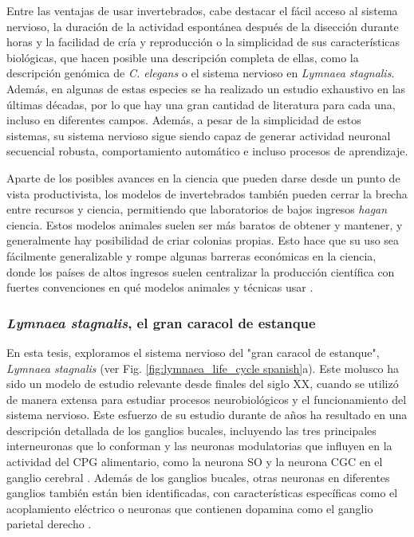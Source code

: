 Entre las ventajas de usar invertebrados, cabe destacar el fácil acceso al sistema nervioso, la duración de la actividad espontánea después de la disección durante horas y la facilidad de cría y reproducción o la simplicidad de sus características biológicas, que hacen posible una descripción completa de ellas, como la descripción genómica de \textit{C. elegans} o el sistema nervioso en \textit{Lymnaea stagnalis}. Además, en algunas de estas especies se ha realizado un estudio exhaustivo en las últimas décadas, por lo que hay una gran cantidad de literatura para cada una, incluso en diferentes campos. Además, a pesar de la simplicidad de estos sistemas, su sistema nervioso sigue siendo capaz de generar actividad neuronal secuencial robusta, comportamiento automático e incluso procesos de aprendizaje.

Aparte de los posibles avances en la ciencia que pueden darse desde un punto de vista productivista, los modelos de invertebrados también pueden cerrar la brecha entre recursos y ciencia, permitiendo que laboratorios de bajos ingresos \textit{hagan} ciencia. Estos modelos animales suelen ser más baratos de obtener y mantener, y generalmente hay posibilidad de criar colonias propias. Esto hace que su uso sea fácilmente generalizable y rompe algunas barreras económicas en la ciencia, donde los países de altos ingresos suelen centralizar la producción científica con fuertes convenciones en qué modelos animales y técnicas usar \parencite{castillo_spineless_2017,stephan_how_2015}.

\subsubsection{\textit{Lymnaea stagnalis}, el gran caracol de estanque}
En esta tesis, exploramos el sistema nervioso del "gran caracol de estanque", \textit{Lymnaea stagnalis} (ver Fig. \ref{fig:lymnaea_life_cycle spanish}a). Este molusco ha sido un modelo de estudio relevante desde finales del siglo XX, cuando se utilizó de manera extensa para estudiar procesos neurobiológicos y el funcionamiento del sistema nervioso. Este esfuerzo de su estudio durante de años ha resultado en una descripción detallada de los ganglios bucales, incluyendo las tres principales interneuronas que lo conforman \parencite{benjamin_snail_1989,benjamin_morphology_1979,rose_relationship_1979,brierley_behavioral_1997} y las neuronas modulatorias que influyen en la actividad del CPG alimentario, como la neurona SO y la neurona CGC en el ganglio cerebral \parencite{rose_interneuronal_1981,mccrohan_patterns_1980,kemenes_multiple_2001}. Además de los ganglios bucales, otras neuronas en diferentes ganglios también están bien identificadas, con características específicas como el acoplamiento eléctrico o neuronas que contienen dopamina como el ganglio parietal derecho \parencite{benjamin_electrotonic_1986,winlow_multiple_1981}.


